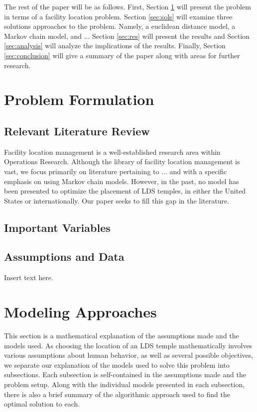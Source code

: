 \documentclass[twoside,twocolumn]{article}
\begin{document}
The rest of the paper will be as follows.
First, Section \ref{sec:prob} will present the problem in terms of a facility location problem.
Section \ref{sec:sols} will examine three solutions approaches to the problem.
Namely, a euclidean distance model, a Markov chain model, and ... %
Section \ref{sec:res} will present the results and Section \ref{sec:analysis} will analyze the implications of the results.
Finally, Section \ref{sec:conclusion} will give a summary of the paper along with areas for further research.

\section{Problem Formulation}
\label{sec:prob}
\subsection{Relevant Literature Review}
Facility location management is a well-established research area within Operations Research. Although the library of facility location management is vast, we focus primarily on literature pertaining to ... and with a specific emphasis on using Markov chain models. However, in the past, no model has been presented to optimize the placement of LDS temples, in either the United States or internationally. Our paper seeks to fill this gap in the literature.
\subsection{Important Variables}
\subsection{Assumptions and Data}

Insert text here.

\section{Modeling Approaches}
\label{sec:models}
This section is a mathematical explanation of the assumptions made and the models used. As choosing the location of an LDS temple mathematically involves various assumptions about human behavior, as well as several possible objectives, we separate our explanation of the models used to solve this problem into subsections. Each subsection is self-contained in the assumptions made and the problem setup. Along with the individual models presented in each subsection, there is also a brief summary of the algorithmic approach used to find the optimal solution to each.
\end{document}
